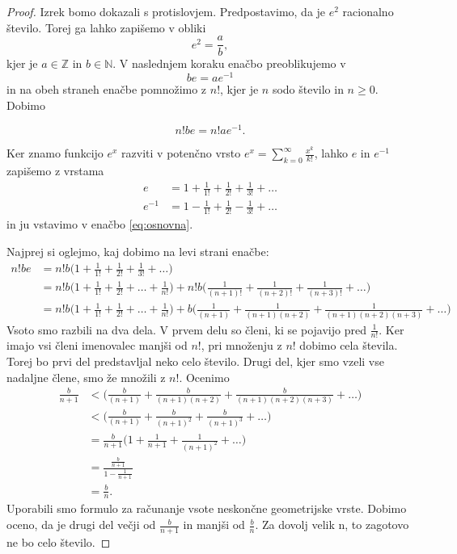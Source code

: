 \documentclass[a4paper]{article}
\theoremstyle{plain}
\begin{document}
\begin{proof}
Izrek bomo dokazali s protislovjem. Predpostavimo, da je $e^2$ racionalno število. Torej ga lahko zapišemo v obliki
\begin{equation*}
e^2 = \frac{a}{b},
\end{equation*}
kjer je $a \in \mathbb{Z}$ in $b \in \mathbb{N}$. V naslednjem koraku enačbo preoblikujemo v 
\begin{equation*}
be = ae^{-1}
\end{equation*}
in na obeh straneh enačbe pomnožimo z $n!$, kjer je $n$ sodo število in $n \ge 0$. Dobimo

\begin{equation}
n!be = n!ae^{-1}.
\label{eq:osnovna}
\end{equation}

Ker znamo funkcijo $e^x$ razviti v potenčno vrsto $e^x = \sum_{k=0}^{\infty}\frac{x^k}{k!}$, lahko $e$ in $e^{-1}$ zapišemo z vrstama
\begin{align*}
e &= 1+\frac{1}{1!}+\frac{1}{2!}+\frac{1}{3!}+\dots \\
e^{-1}&= 1-\frac{1}{1!}+\frac{1}{2!}-\frac{1}{3!}+\dots 
\end{align*}
in ju vstavimo v enačbo \eqref{eq:osnovna}.

Najprej si oglejmo, kaj dobimo na levi strani enačbe:
\begin{align*}
n!be &= n!b \bigg(1+\frac{1}{1!}+\frac{1}{2!}+\frac{1}{3!}+\dots \bigg) \\
&=n!b \bigg(1+\frac{1}{1!}+\frac{1}{2!}+\dots+\frac{1}{n!}\bigg) + n!b \bigg( \frac{1}{(n+1)!}+\frac{1}{(n+2)!}+\frac{1}{(n+3)!}+\dots\bigg)\\
&=n!b \bigg(1+\frac{1}{1!}+\frac{1}{2!}+\dots+\frac{1}{n!}\bigg) + b \bigg( \frac{1}{(n+1)}+\frac{1}{(n+1)(n+2)}+\frac{1}{(n+1)(n+2)(n+3)}+\dots\bigg)
\end{align*}
Vsoto smo razbili na dva dela. V prvem delu so členi, ki se pojavijo pred $\frac{1}{n!}$. Ker imajo vsi členi imenovalec manjši od $n!$, pri množenju z $n!$ dobimo cela števila. Torej bo prvi del predstavljal neko celo število. Drugi del, kjer smo vzeli vse nadaljne člene, smo že množili z $n!$. Ocenimo
\begin{align*}
\frac{b}{n+1} &< \bigg( \frac{b}{(n+1)}+\frac{b}{(n+1)(n+2)}+\frac{b}{(n+1)(n+2)(n+3)}+\dots\bigg) \\
&< \bigg( \frac{b}{(n+1)}+\frac{b}{(n+1)^2}+\frac{b}{(n+1)^3}+\dots\bigg) \\
&= \frac{b}{n+1} \bigg(1+\frac{1}{n+1}+\frac{1}{(n+1)^2}+ \dots\bigg) \\
&= \frac{\frac{b}{n+1}}{1-\frac{1}{n+1}}\\
&= \frac{b}{n}.
\end{align*}
Uporabili smo formulo za računanje vsote neskončne geometrijske vrste. Dobimo oceno, da je drugi del večji od $\frac{b}{n+1}$ in manjši od $\frac{b}{n}$. Za dovolj velik n, to zagotovo ne bo celo število.


\end{proof}
\end{document}
